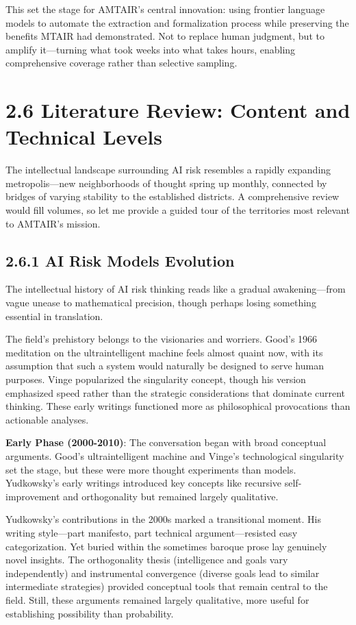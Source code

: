 \documentclass[
  11pt,
  letterpaper,
  openany]{book}
\begin{document}
This set the stage for AMTAIR's central innovation: using frontier
language models to automate the extraction and formalization process
while preserving the benefits MTAIR had demonstrated. Not to replace
human judgment, but to amplify it---turning what took weeks into what
takes hours, enabling comprehensive coverage rather than selective
sampling.

\section{2.6 Literature Review: Content and Technical
Levels}\label{sec-literature-review}

The intellectual landscape surrounding AI risk resembles a rapidly
expanding metropolis---new neighborhoods of thought spring up monthly,
connected by bridges of varying stability to the established districts.
A comprehensive review would fill volumes, so let me provide a guided
tour of the territories most relevant to AMTAIR's mission.

\subsection{2.6.1 AI Risk Models
Evolution}\label{sec-risk-models-evolution}

The intellectual history of AI risk thinking reads like a gradual
awakening---from vague unease to mathematical precision, though perhaps
losing something essential in translation.

The field's prehistory belongs to the visionaries and worriers. Good's
1966 meditation on the ultraintelligent machine feels almost quaint now,
with its assumption that such a system would naturally be designed to
serve human purposes. Vinge popularized the singularity concept, though
his version emphasized speed rather than the strategic considerations
that dominate current thinking. These early writings functioned more as
philosophical provocations than actionable analyses.

\textbf{Early Phase (2000-2010)}: The conversation began with broad
conceptual arguments. Good's ultraintelligent machine
\textcite{good1966} and Vinge's technological singularity set the stage,
but these were more thought experiments than models. Yudkowsky's early
writings \textcite{yudkowsky2008} introduced key concepts like recursive
self-improvement and orthogonality but remained largely qualitative.

Yudkowsky's contributions in the 2000s marked a transitional moment. His
writing style---part manifesto, part technical argument---resisted easy
categorization. Yet buried within the sometimes baroque prose lay
genuinely novel insights. The orthogonality thesis (intelligence and
goals vary independently) and instrumental convergence (diverse goals
lead to similar intermediate strategies) provided conceptual tools that
remain central to the field. Still, these arguments remained largely
qualitative, more useful for establishing possibility than probability.
\end{document}
